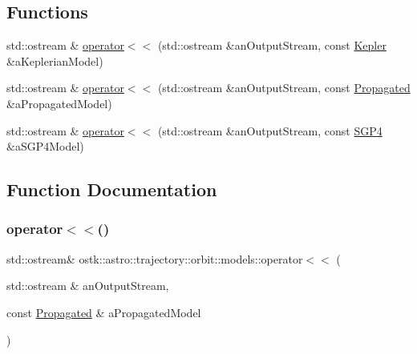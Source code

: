 \subsection*{Functions}
\begin{DoxyCompactItemize}
\item 
std\+::ostream \& \hyperlink{namespaceostk_1_1astro_1_1trajectory_1_1orbit_1_1models_a57c1332ade54f2075a0efee474d5b46d}{operator$<$$<$} (std\+::ostream \&an\+Output\+Stream, const \hyperlink{classostk_1_1astro_1_1trajectory_1_1orbit_1_1models_1_1_kepler}{Kepler} \&a\+Keplerian\+Model)
\item 
std\+::ostream \& \hyperlink{namespaceostk_1_1astro_1_1trajectory_1_1orbit_1_1models_a14bc56b47c4aa94b8cec0d4768b1e893}{operator$<$$<$} (std\+::ostream \&an\+Output\+Stream, const \hyperlink{classostk_1_1astro_1_1trajectory_1_1orbit_1_1models_1_1_propagated}{Propagated} \&a\+Propagated\+Model)
\item 
std\+::ostream \& \hyperlink{namespaceostk_1_1astro_1_1trajectory_1_1orbit_1_1models_a5683eb8d1e09c5efb5f98e43a439284c}{operator$<$$<$} (std\+::ostream \&an\+Output\+Stream, const \hyperlink{classostk_1_1astro_1_1trajectory_1_1orbit_1_1models_1_1_s_g_p4}{S\+G\+P4} \&a\+S\+G\+P4\+Model)
\end{DoxyCompactItemize}


\subsection{Function Documentation}
\mbox{\label{namespaceostk_1_1astro_1_1trajectory_1_1orbit_1_1models_a14bc56b47c4aa94b8cec0d4768b1e893}} 
\subsubsection{\texorpdfstring{operator$<$$<$()}{operator<<()}\hspace{0.1cm}{\footnotesize\ttfamily [1/3]}}
{\footnotesize\ttfamily std\+::ostream\& ostk\+::astro\+::trajectory\+::orbit\+::models\+::operator$<$$<$ (\begin{DoxyParamCaption}\item[{std\+::ostream \&}]{an\+Output\+Stream,  }\item[{const \hyperlink{classostk_1_1astro_1_1trajectory_1_1orbit_1_1models_1_1_propagated}{Propagated} \&}]{a\+Propagated\+Model }\end{DoxyParamCaption})}


